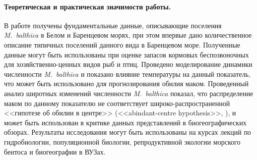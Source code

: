 \paragraph{Теоретическая и практическая значимости работы.}
В работе получены фундаментальные данные, описывающие поселения \textit{M.~balthica} в Белом и Баренцевом морях, при этом впервые дано количественное описание типичных поселений данного вида в Баренцевом море. 
Полученные данные могут быть использованы при оценке запасов кормовых беспозвоночных для хозяйственно-ценных видов рыб и птиц.
Проведено моделирование динамики численности \textit{M.~balthica} и показано влияние температуры на данный показатель, что может быть использовано для прогнозирования обилия маком. 
Проведенный анализ широтных изменений численности \textit{M.~balthica} показал, что распределение маком по данному показателю не соответствует широко-распространенной  <<гипотезе об обилии в центре>> (<<abindant-centre hypothesis>>, \cite{Sagarin_et_al_2006}), и может быть использован в критике данных представлений в биогеографических обзорах.
Результаты исследования могут быть использованы на курсах лекций по гидробиологии, популяционной биологии, репродуктивной экологии морского бентоса и биогеографии в ВУЗах.

